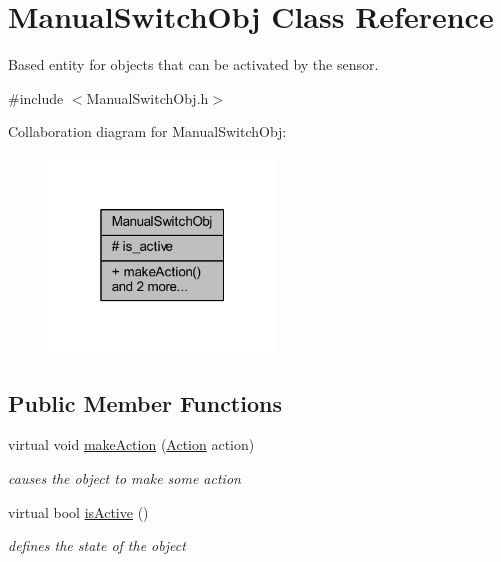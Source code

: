 \hypertarget{class_manual_switch_obj}{}\section{Manual\+Switch\+Obj Class Reference}
\label{class_manual_switch_obj}


Based entity for objects that can be activated by the sensor.  




{\ttfamily \#include $<$Manual\+Switch\+Obj.\+h$>$}



Collaboration diagram for Manual\+Switch\+Obj\+:
\nopagebreak
\begin{figure}[H]
\begin{center}
\leavevmode
\includegraphics[width=172pt]{class_manual_switch_obj__coll__graph}
\end{center}
\end{figure}
\subsection*{Public Member Functions}
\begin{DoxyCompactItemize}
\item 
virtual void \hyperlink{class_manual_switch_obj_a4d4a826fb8211a787f158b2973f843ae}{make\+Action} (\hyperlink{_manual_switch_obj_8h_a8bb1ef53467e4f61410d12822d922498}{Action} action)
\begin{DoxyCompactList}\small\item\em causes the object to make some action \end{DoxyCompactList}\item 
virtual bool \hyperlink{class_manual_switch_obj_a4d6cc0a3de424ab6bf4665eeb0f639af}{is\+Active} ()
\begin{DoxyCompactList}\small\item\em defines the state of the object \end{DoxyCompactList}\end{DoxyCompactItemize}

